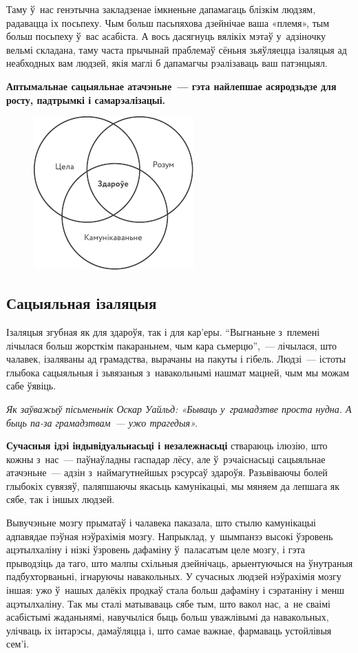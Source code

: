 Таму ў~нас генэтычна закладзенае імкненьне дапамагаць блізкім людзям, радавацца іх посьпеху. Чым больш пасьпяхова дзейнічае ваша «племя», тым больш посьпеху ў~вас асабіста. А вось дасягнуць вялікіх мэтаў у~адзіночку вельмі складана, таму часта прычынай праблемаў сёньня зьяўляецца ізаляцыя ад неабходных вам людзей, якія маглі б дапамагчы рэалізаваць ваш патэнцыял. 

\textbf{Аптымальнае сацыяльнае атачэньне~--- гэта найлепшае асяродзьдзе для росту, падтрымкі і самарэалізацыі.}

\begin{figure}[htb!]
  \centering
  \includegraphics[scale=1.5]{willpower/ch10/1.pdf}
\end{figure}

\subsection*{Сацыяльная ізаляцыя}

Ізаляцыя згубная як для здароўя, так і для кар'еры. ``Выгнаньне з~племені лічылася больш жорсткім пакараньнем, чым кара сьмерцю'',~--- лічылася, што чалавек, ізаляваны ад грамадства, вырачаны на пакуты і гібель. Людзі~--- істоты глыбока сацыяльныя і зьвязаныя з~навакольнымі нашмат мацней, чым мы можам сабе ўявіць.

\emph{Як заўважыў пісьменьнік Оскар Уайльд: «Бываць у~грамадзтве проста нудна. А быць па-за грамадзтвам~--- ужо трагедыя».}

\textbf{Сучасныя ідэі індывідуальнасьці і незалежнасьці} ствараюць ілюзію, што кожны з~нас~--- паўнаўладны гаспадар лёсу, але ў~рэчаіснасьці сацыяльнае атачэньне~--- адзін з~наймагутнейшых рэсурсаў здароўя. Разьвіваючы болей глыбокіх сувязяў, паляпшаючы якасьць камунікацыі, мы мяняем да лепшага як сябе, так і іншых людзей.

Вывучэньне мозгу прыматаў і чалавека паказала, што стылю камунікацыі адпавядае пэўная нэўрахімія мозгу. Напрыклад, у~шымпанзэ высокі ўзровень ацэтылхаліну і нізкі ўзровень дафаміну ў~паласатым целе мозгу, і гэта прыводзіць да таго, што малпы схільныя дзейнічаць, арыентуючыся на ўнутраныя падбухторваньні, ігнаруючы навакольных. У сучасных людзей нэўрахімія мозгу іншая: ужо ў~нашых далёкіх продкаў стала больш дафаміну і сэратаніну і менш ацэтылхаліну. Так мы сталі матываваць сябе тым, што вакол нас, а~не сваімі асабістымі жаданьнямі, навучыліся быць больш уважлівымі да навакольных, улічваць іх інтарэсы, дамаўляцца і, што самае важнае, фармаваць устойлівыя сем'і.


